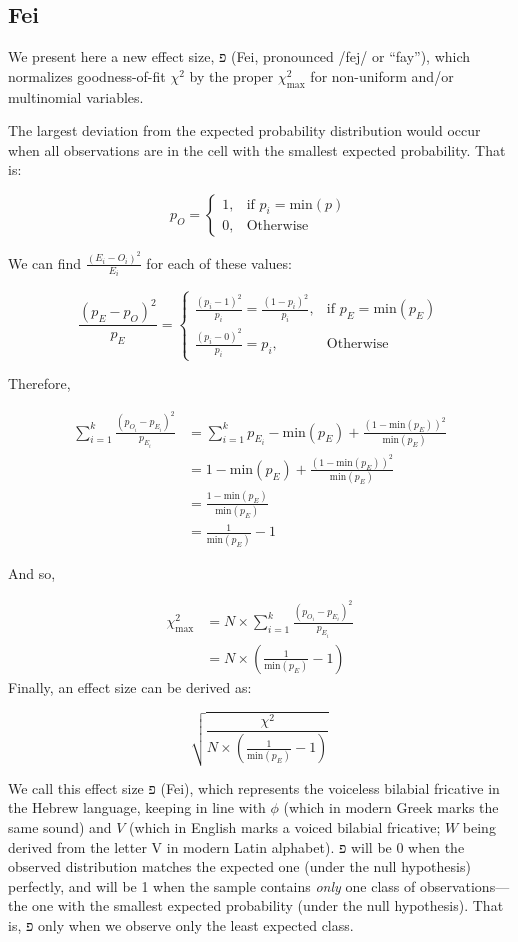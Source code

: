 \documentclass[mathematics,article,submit,moreauthors,pdftex]{mdpi}
\begin{document}
\hypertarget{fei}{%
\subsection{Fei}\label{fei}}

We present here a new effect size, פ (Fei, pronounced /fej/ or ``fay''),
which normalizes goodness-of-fit \(\chi^2\) by the proper
\(\chi^2_\text{max}\) for non-uniform and/or multinomial variables.

The largest deviation from the expected probability distribution would
occur when all observations are in the cell with the smallest expected
probability. That is:

\[
p_{O} = 
\begin{cases}
1, & \text{if } p_i = \text{min}(p) \\
0, & \text{Otherwise}
\end{cases}
\]

We can find \(\frac{(E_i-O_i)^2}{E_i}\) for each of these values:

\[
\frac{(p_{E}-p_{O})^2}{p_{E}} = 
\begin{cases}
\frac{(p_i-1)^2}{p_i} = \frac{(1-p_i)^2}{p_i}, & \text{if } p_{E} = \text{min}(p_{E}) \\
\frac{(p_i-0)^2}{p_i} = p_i, & \text{Otherwise}
\end{cases}
\]

Therefore,

\[
\begin{split}
\sum_{i=1}^{k}{\frac{(p_{O_i}-p_{E_i})^2}{p_{E_i}}} & = \sum_{i=1}^{k}{p_{E_i}} - \text{min}(p_{E}) + \frac{(1-\text{min}(p_{E}))^2}{\text{min}(p_{E})} \\
& = 1 - \text{min}(p_E) + \frac{(1-\text{min}(p_E))^2}{\text{min}(p_E)} \\
& = \frac{1-\text{min}(p_E)}{\text{min}(p_E)} \\
& = \frac{1}{\text{min}(p_E)} - 1
\end{split}
\]

And so,

\[
\begin{split}
\chi^2_\text{max} & = N \times \sum_{i=1}^{k}{\frac{(p_{O_i}-p_{E_i})^2}{p_{E_i}}} \\
 & = N \times (\frac{1}{\text{min}(p_E)} - 1)
\end{split}
\] Finally, an effect size can be derived as:

\[
\sqrt{\frac{\chi^2}{N \times (\frac{1}{\text{min}(p_E)} - 1)}}
\]

We call this effect size פ (Fei), which represents the voiceless
bilabial fricative in the Hebrew language, keeping in line with \(\phi\)
(which in modern Greek marks the same sound) and \(V\) (which in English
marks a voiced bilabial fricative; \(W\) being derived from the letter V
in modern Latin alphabet). פ will be 0 when the observed distribution
matches the expected one (under the null hypothesis) perfectly, and will
be 1 when the sample contains \emph{only} one class of
observations---the one with the smallest expected probability (under the
null hypothesis). That is, פ only when we observe only the least
expected class.
\end{document}
